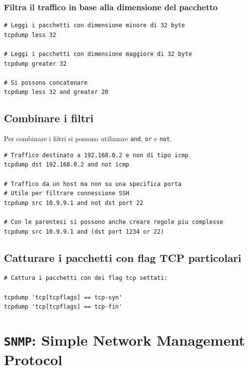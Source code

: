 \documentclass[a4paper]{report}
\newenvironment{code}{\begin{tcolorbox}[size=small]}{\end{tcolorbox}}
\begin{document}
\subsection{Filtra il traffico in base alla dimensione del pacchetto}
\begin{code}
\begin{lstlisting}
# Leggi i pacchetti con dimensione minore di 32 byte
tcpdump less 32

# Leggi i pacchetti con dimensione maggiore di 32 byte
tcpdump greater 32

# Si possono concatenare
tcpdump less 32 and greater 20
\end{lstlisting}
\end{code}

\section{Combinare i filtri}

Per combinare i filtri si possono utilizzare \texttt{and}, \texttt{or} e \texttt{not}.
\begin{code}
\begin{lstlisting}
# Traffico destinato a 192.168.0.2 e non di tipo icmp
tcpdump dst 192.168.0.2 and not icmp

# Traffico da un host ma non su una specifica porta
# Utile per filtrare connessione SSH
tcpdump src 10.9.9.1 and not dst port 22

# Con le parentesi si possono anche creare regole piu complesse
tcpdump src 10.9.9.1 and (dst port 1234 or 22)
\end{lstlisting}
\end{code}

\section{Catturare i pacchetti con flag TCP particolari}
\begin{code}
\begin{lstlisting}
# Cattura i pacchetti con dei flag tcp settati:

tcpdump 'tcp[tcpflags] == tcp-syn'
tcpdump 'tcp[tcpflags] == tcp-fin'
\end{lstlisting}
\end{code}

\chapter{\texttt{SNMP}: Simple Network Management Protocol}
\end{document}
